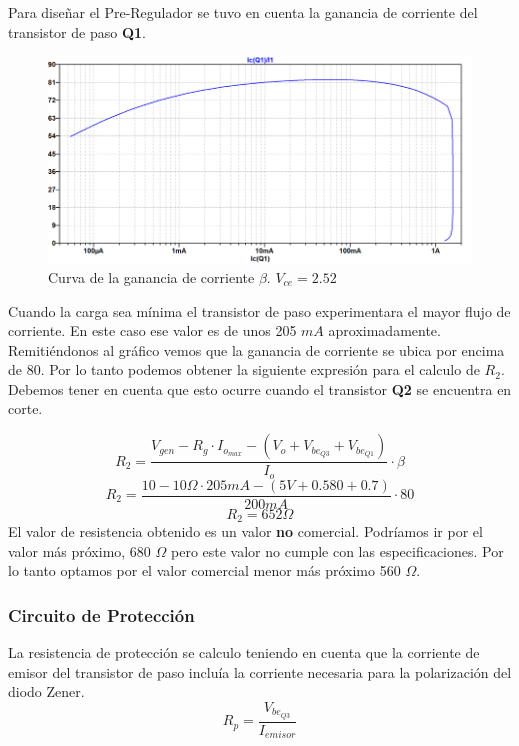 Para diseñar el Pre-Regulador se tuvo en cuenta la ganancia de corriente del transistor de paso \textbf{Q1}.
\begin{figure}[H]
	\centering
	\includegraphics[width=0.7\linewidth]{ImagenesEjercicio1/BetaTPasoFV}
	\caption{Curva de la ganancia de corriente $\beta$. $V_{ce}=2.52$}
	\label{fig:betatpasofv}
\end{figure}
Cuando la carga sea mínima el transistor de paso experimentara el mayor flujo de corriente. En este caso ese valor es de unos 205 $mA$ aproximadamente. Remitiéndonos al gráfico vemos que la ganancia de corriente se ubica por encima de 80. 
Por lo tanto podemos obtener la siguiente expresión para el calculo de $R_2$. Debemos tener en cuenta que esto ocurre cuando el transistor \textbf{Q2} se encuentra en corte.

\begin{equation}
R_{2} = \frac{V_{gen}-R_{g}\cdot I_{o_{max}} - (V_o + V_{be_{Q3}} + V_{be_{Q1}}  )}{I_o} \cdot \beta
\end{equation}
\begin{equation}
R_{2} = \frac{10 - 10 \Omega \cdot 205mA - (5V + 0.580 +0.7)  }{200mA} \cdot 80
\end{equation}
\begin{equation}
R_{2} = 652 \Omega
\end{equation}
El valor de resistencia obtenido es un valor \textbf{no} comercial. Podríamos ir por el valor más próximo, 680 $\Omega$ pero este valor no cumple con las especificaciones. Por lo tanto optamos por el valor comercial menor más próximo 560 $\Omega$.
\subsubsection{Circuito de Protección}
La resistencia de protección se calculo teniendo en cuenta que la corriente de emisor del transistor de paso incluía la corriente necesaria para la polarización del diodo Zener. 
\begin{equation}
	R_p = \frac{V_{be_{Q3}}}{I_{emisor}}
\end{equation}

